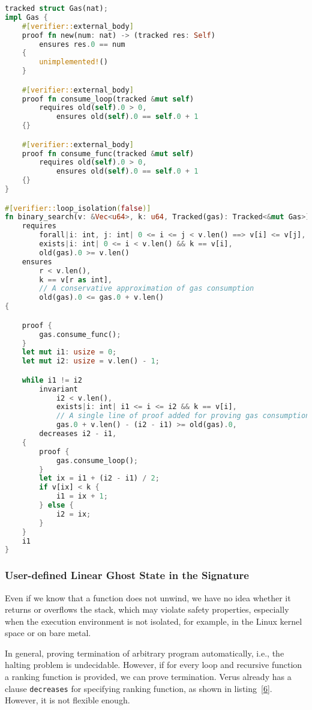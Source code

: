 \documentclass[conference]{IEEEtran}
\begin{document}
\begin{lstlisting}[language=Rust,style=colouredRust, caption={Linear Ghost Type for Tracking Complexity}, label = {7}]
tracked struct Gas(nat);
impl Gas {
    #[verifier::external_body]
    proof fn new(num: nat) -> (tracked res: Self) 
        ensures res.0 == num
    {
        unimplemented!()
    }

    #[verifier::external_body]
    proof fn consume_loop(tracked &mut self)
        requires old(self).0 > 0,
            ensures old(self).0 == self.0 + 1
    {}

    #[verifier::external_body]
    proof fn consume_func(tracked &mut self)
        requires old(self).0 > 0,
            ensures old(self).0 == self.0 + 1
    {}
}

#[verifier::loop_isolation(false)]
fn binary_search(v: &Vec<u64>, k: u64, Tracked(gas): Tracked<&mut Gas>) -> (r: usize)
    requires
        forall|i: int, j: int| 0 <= i <= j < v.len() ==> v[i] <= v[j],
        exists|i: int| 0 <= i < v.len() && k == v[i],
        old(gas).0 >= v.len()
    ensures
        r < v.len(),
        k == v[r as int],
        // A conservative approximation of gas consumption
        old(gas).0 <= gas.0 + v.len()
{

    proof {
        gas.consume_func();
    }
    let mut i1: usize = 0;
    let mut i2: usize = v.len() - 1;

    while i1 != i2
        invariant
            i2 < v.len(),
            exists|i: int| i1 <= i <= i2 && k == v[i],
            // A single line of proof added for proving gas consumption
            gas.0 + v.len() - (i2 - i1) >= old(gas).0,
        decreases i2 - i1,
    {
        proof {
            gas.consume_loop();
        }
        let ix = i1 + (i2 - i1) / 2;
        if v[ix] < k {
            i1 = ix + 1;
        } else {
            i2 = ix;
        }
    }
    i1
}
\end{lstlisting}

\subsubsection{User-defined Linear Ghost State in the Signature}
Even if we know that a function does not unwind, we have no idea whether it returns or overflows the stack, which may violate safety properties, especially when the execution environment is not isolated, for example, in the Linux kernel space or on bare metal.

In general, proving termination of arbitrary program automatically, i.e., the halting problem is undecidable. However, if for every loop and recursive function a ranking function is provided, we can prove termination. Verus already has a clause \texttt{decreases} for specifying ranking function, as shown in listing~\ref{6}. However, it is not flexible enough. 
\end{document}
